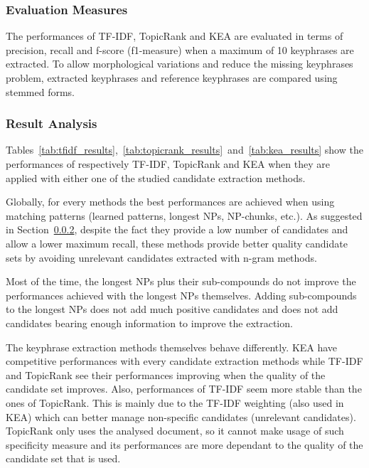     \subsubsection{Evaluation Measures}
    \label{subsubsec:keyphrase_extraction_evaluation_measures}
      The performances of TF-IDF, TopicRank and KEA are evaluated in terms of
      precision, recall and f-score (f1-measure) when a maximum of 10 keyphrases
      are extracted. To allow morphological variations and reduce the missing
      keyphrases problem, extracted keyphrases and reference keyphrases are
      compared using stemmed forms.

    \subsubsection{Result Analysis}
    \label{subsubsec:candidate_extraction_result_analysis}
      Tables~\ref{tab:tfidf_results},~\ref{tab:topicrank_results}~and~\ref{tab:kea_results}
      show the performances of respectively TF-IDF, TopicRank and KEA when
      they are applied with either one of the studied candidate extraction
      methods.

      Globally, for every methods the best performances are achieved when using
      matching patterns (learned patterns, longest NPs, NP-chunks, etc.). As
      suggested in Section~\ref{subsubsec:candidate_extraction_result_analysis},
      despite the fact they provide a low number of candidates and allow a lower
      maximum recall, these methods provide better quality candidate sets by
      avoiding unrelevant candidates extracted with n-gram methods.

      Most of the time, the longest NPs plus their sub-compounds do not improve
      the performances achieved with the longest NPs themselves. Adding
      sub-compounds to the longest NPs does not add much positive candidates and
      does not add candidates bearing enough information to improve the
      extraction.

      The keyphrase extraction methods themselves behave differently. KEA have
      competitive performances with every candidate extraction methods while
      TF-IDF and TopicRank see their performances improving when the quality of
      the candidate set improves. Also, performances of TF-IDF seem more stable
      than the ones of TopicRank. This is mainly due to the TF-IDF weighting
      (also used in KEA) which can better manage non-specific candidates
      (unrelevant candidates). TopicRank only uses the analysed document, so it
      cannot make usage of such specificity measure and its performances are
      more dependant to the quality of the candidate set that is used.

